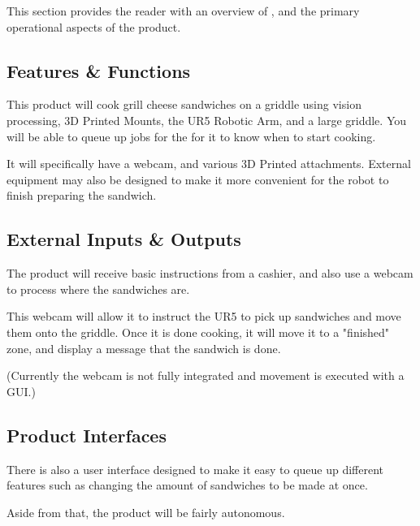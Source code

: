 This section provides the reader with an overview of \productname{}, and the primary operational aspects of the product.

\subsection{Features \& Functions}

This product will cook grill cheese sandwiches on a griddle using vision processing, 3D Printed Mounts, the UR5 Robotic Arm, and a large griddle. You will be able to queue up jobs for the \productname{} for it to know when to start cooking. 

It will specifically have a webcam, and various 3D Printed attachments. External equipment may also be designed to make it more convenient for the robot to finish preparing the sandwich. 

\subsection{External Inputs \& Outputs}
The product will receive basic instructions from a cashier, and also use a webcam to process where the sandwiches are. 

This webcam will allow it to instruct the UR5 to pick up sandwiches and move them onto the griddle. Once it is done cooking, it will move it to a "finished" zone, and display a message that the sandwich is done. 

(Currently the webcam is not fully integrated and movement is executed with a GUI.)

\subsection{Product Interfaces}
There is also a user interface designed to make it easy to queue up different features such as changing the amount of sandwiches to be made at once. 

Aside from that, the product will be fairly autonomous. 